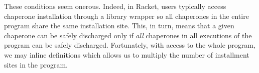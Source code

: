 


These conditions seem onerous.
Indeed, in Racket, users typically access chaperone installation through a library wrapper so all chaperones in the entire program share the same installation site.
This, in turn, means that a given chaperone can be safely discharged only if \emph{all} chaperones in all executions of the program can be safely discharged.
Fortunately, with access to the whole program, we may inline definitions which allows us to multiply the number of installment sites in the program.










